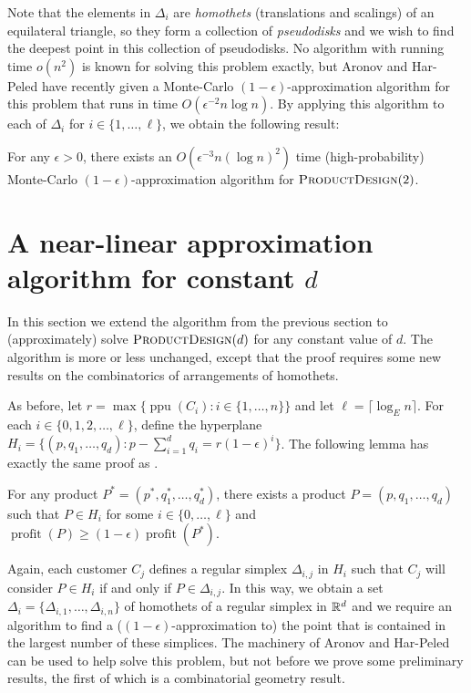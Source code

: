 \documentclass{llncs}
\newcommand{\ppu}{\operatorname{ppu}}
\newcommand{\val}{\operatorname{profit}}
\newcommand{\eps}{\epsilon}
\begin{document}
Note that the elements in $\Delta_i$ are \emph{homothets} (translations and
scalings) of an equilateral triangle, so they form a collection of
\emph{pseudodisks} and we wish to find the deepest point in this collection
of pseudodisks.  No algorithm with running time $o(n^2)$ is known for
solving this problem exactly, but Aronov and Har-Peled \cite{ah08} have
recently given a Monte-Carlo $(1-\eps)$-approximation algorithm for this
problem that runs in time $O(\eps^{-2}n\log n)$.  By applying this
algorithm to each of $\Delta_i$ for $i\in\{1,\ldots,\ell\}$, we obtain the
following result:

\begin{thm}
  For any $\eps >0$, there exists an $O(\eps^{-3}n(\log n)^2)$ time
  (high-probability) Monte-Carlo $(1-\eps)$-approximation algorithm for
  $\textsc{ProductDesign}(2)$.
\end{thm}

\section{A near-linear approximation algorithm for constant $d$}

In this section we extend the algorithm from the previous section to
(approximately) solve $\textsc{ProductDesign}(d)$ for any constant value of
$d$.  The algorithm is more or less unchanged, except that the proof
requires some new results on the combinatorics of arrangements of
homothets.

As before, let $r=\max\{\ppu(C_i) : i\in\{1,\ldots, n\}\}$ and let
$\ell = \lceil\log_E n\rceil$. For each $i\in\{0,1,2,\ldots,\ell\}$,
define the hyperplane $H_i = \{ (p,q_1,\ldots,q_d) : p-\sum_{i=1}^d
q_i =  r(1-\eps)^i \}$.  The following lemma has exactly the same proof
as .

\begin{lem}
  For any product $P^*=(p^*,q_1^*,\ldots,q_d^*)$, there exists
  a product $P=(p,q_1,\ldots,q_d)$ such that $P\in H_i$ for some
  $i\in\{0,\ldots,\ell\}$ and $\val(P) \ge (1-\eps)\val(P^*)$.
\end{lem}

Again, each customer $C_j$ defines a regular simplex $\Delta_{i,j}$
in $H_{i}$ such that $C_j$ will consider $P\in H_i$ if and
only if $P\in\Delta_{i,j}$.  In this way, we obtain a set
$\Delta_i=\{\Delta_{i,1},\ldots,\Delta_{i,n}\}$ of homothets of
a regular simplex in $\mathbb{R}^d$ and we require an algorithm to find a
($(1-\eps)$-approximation to) the point that is contained in the largest
number of these simplices.  The machinery of Aronov and Har-Peled
\cite{ah08} can be used to help solve this problem, but not before we
prove some preliminary results, the first of which is a combinatorial
geometry result.
\end{document}
